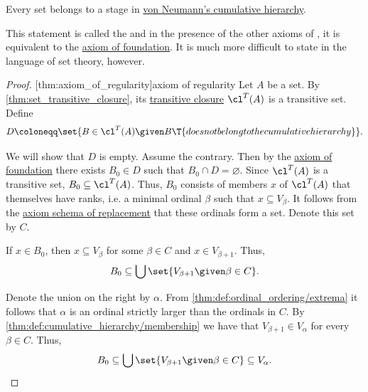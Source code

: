 \begin{theorem}\label{thm:axiom_of_regularity}
  Every set belongs to a stage in \hyperref[def:cumulative_hierarchy]{von Neumann's cumulative hierarchy}.
\end{theorem}
\begin{comments}
  \item This statement is called the  and in the presence of the other axioms of , it is equivalent to the \hyperref[def:zfc/foundation]{axiom of foundation}. It is much more difficult to state in the language of set theory, however.
\end{comments}
\begin{proof}
  [thm:axiom_of_regularity]{axiom of regularity} Let \( A \) be a set. By \cref{thm:set_transitive_closure}, its \hyperref[def:set_transitive_closure]{transitive closure} \( \cl^T(A) \) is a transitive set. Define
  \begin{equation*}
    D \coloneqq \set{ B \in \cl^T(A) \given B \T{does not belong to the cumulative hierarchy} }.
  \end{equation*}

  We will show that \( D \) is empty. Assume the contrary. Then by the \hyperref[def:zfc/foundation]{axiom of foundation} there exists \( B_0 \in D \) such that \( B_0 \cap D = \varnothing \). Since \( \cl^T(A) \) is a transitive set, \( B_0 \subseteq \cl^T(A) \). Thus, \( B_0 \) consists of members \( x \) of \( \cl^T(A) \) that themselves have ranks, i.e. a minimal ordinal \( \beta \) such that \( x \subseteq V_\beta \). It follows from the \hyperref[def:zfc/replacement]{axiom schema of replacement} that these ordinals form a set. Denote this set by \( C \).

  If \( x \in B_0 \), then \( x \subseteq V_\beta \) for some \( \beta \in C \) and \( x \in V_{\beta + 1} \). Thus,
  \begin{equation*}
    B_0 \subseteq \bigcup\set{ V_{\beta + 1} \given \beta \in C }.
  \end{equation*}


  Denote the union on the right by \( \alpha \). From \cref{thm:def:ordinal_ordering/extrema} it follows that \( \alpha \) is an ordinal strictly larger than the ordinals in \( C \). By \cref{thm:def:cumulative_hierarchy/membership} we have that \( V_{\beta + 1} \in V_\alpha \) for every \( \beta \in C \). Thus,
  \begin{equation*}
    B_0 \subseteq \bigcup\set{ V_{\beta + 1} \given \beta \in C } \subseteq V_\alpha.
  \end{equation*}


\end{proof}
